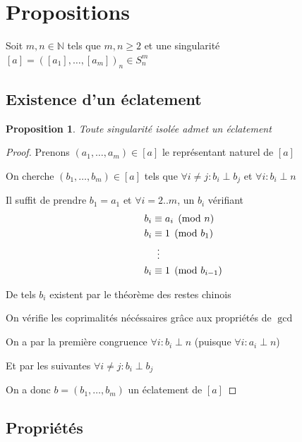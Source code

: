 \documentclass{article}
\newtheorem{proposition}{Proposition}
\begin{document}
\newpage

\section{Propositions}

Soit $m, n \in \mathbb{N}$ tels que $m, n \geq 2$ et une singularité $[a] = {([a_1], \dots, [a_m])}_n \in S_n^m$

\subsection{Existence d'un éclatement}

\begin{proposition}
    Toute singularité isolée admet un éclatement
\end{proposition}

\begin{proof}
    Prenons $(a_1, \dots, a_m) \in [a]$ le représentant naturel de $[a]$

    On cherche $(b_1, \dots, b_m) \in [a]$ tels que $\forall i \neq j : b_i \perp b_j$ et $\forall i : b_i \perp n$

    Il suffit de prendre $b_1 = a_1$ et $\forall i = 2..m$, un $b_i$ vérifiant
    \begin{align*}
        b_i & \equiv a_i \pmod n \\
        b_i & \equiv 1 \pmod {b_1} \\
            & \vdotswithin{\equiv} \\
        b_i & \equiv 1 \pmod {b_{i-1}}
    \end{align*}

    De tels $b_i$ existent par le théorème des restes chinois

    On vérifie les coprimalités nécéssaires grâce aux propriétés de $\gcd$
    
    \hspace{\parindent} On a par la première congruence $\forall i : b_i \perp n$ (puisque $\forall i : a_i \perp n$)

    \hspace{\parindent} Et par les suivantes $\forall i \neq j : b_i \perp b_j$

    On a donc $b = (b_1, \dots, b_m)$ un éclatement de $[a]$
\end{proof}

\subsection{Propriétés}
\end{document}
